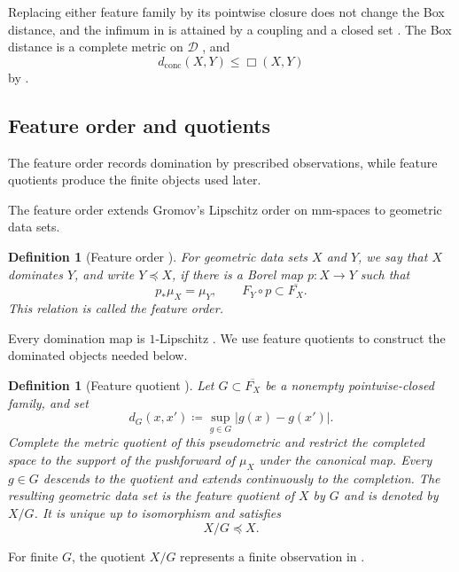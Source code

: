 \documentclass[10pt,a4paper]{amsart}
\newtheorem{definition}[theorem]{Definition}
\newcommand{\D}{\mathcal D}
\newcommand{\dconc}{d_{\mathrm{conc}}}
\begin{document}
Replacing either feature family by its pointwise closure does not change the Box distance, and the infimum in  is attained by a coupling and a closed set \cite[Theorem~5.14]{gds1}. The Box distance is a complete metric on $\D$ \cite[Theorem~1.4]{gds1}, and
\[\dconc(X,Y)\leq\Box(X,Y)\]
by \cite[Proposition~5.8]{gds1}.

\subsection{Feature order and quotients}
\label{subsec:feature-order-quotient}

The feature order records domination by prescribed observations, while feature quotients produce the finite objects used later.

The feature order \cite[Definition~3.8]{gds1} extends Gromov's Lipschitz order on mm-spaces \cite[Definition~3\(\frac12\).15, p.~134]{gromov2007met} to geometric data sets.

\begin{definition}[Feature order {\cite[Definition~3.8]{gds1}}]
\label{def:feature-order}
For geometric data sets $X$ and $Y$, we say that $X$ \emph{dominates} $Y$, and write $Y\preceq X$, if there is a Borel map $p\colon X\to Y$ such that
\[p_*\mu_X=\mu_Y,\qquad F_Y\circ p\subset\overline{F_X}.\]
This relation is called the \emph{feature order}.
\end{definition}

Every domination map is $1$-Lipschitz \cite[Proposition~3.10]{gds1}. We use feature quotients to construct the dominated objects needed below.

\begin{definition}[Feature quotient {\cite[Definition~3.16 and Propositions~3.17 and~3.19]{gds1}}]
\label{def:feature-quotient}
Let $G\subset\overline{F_X}$ be a nonempty pointwise-closed family, and set
\[d_G(x,x')\coloneqq\sup_{g\in G}|g(x)-g(x')|.\]
Complete the metric quotient of this pseudometric and restrict the completed space to the support of the pushforward of $\mu_X$ under the canonical map. Every $g\in G$ descends to the quotient and extends continuously to the completion. The resulting geometric data set is the \emph{feature quotient} of $X$ by $G$ and is denoted by $X/G$. It is unique up to isomorphism and satisfies
\[X/G\preceq X.\]
\end{definition}

For finite $G$, the quotient $X/G$ represents a finite observation in .
\end{document}
